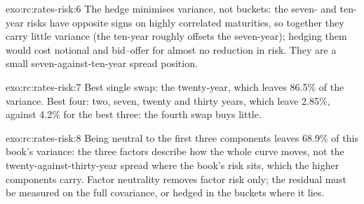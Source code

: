 \begin{solution}{exo:rc:rates-risk:6}
The hedge minimises variance, not buckets: the seven- and ten-year risks have
opposite signs on highly correlated maturities, so together they carry little
variance (the ten-year roughly offsets the seven-year); hedging them would cost
notional and bid--offer for almost no reduction in risk. They are a small
seven-against-ten-year spread position.
\end{solution}

\begin{solution}{exo:rc:rates-risk:7}
Best single swap: the twenty-year, which leaves 86.5\% of the variance. Best
four: two, seven, twenty and thirty years, which leave 2.85\%, against 4.2\%
for the best three: the fourth swap buys little.
\end{solution}

\begin{solution}{exo:rc:rates-risk:8}
Being neutral to the first three components leaves 68.9\% of this book's
variance: the three factors describe how the whole curve moves, not the
twenty-against-thirty-year spread where the book's risk sits, which the higher
components carry. Factor neutrality removes factor risk only; the residual must
be measured on the full covariance, or hedged in the buckets where it lies.
\end{solution}

